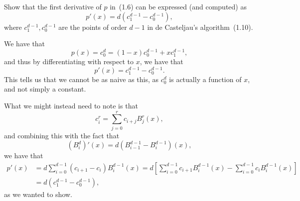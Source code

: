 \begin{exercise}
    Show that the first derivative of $p$ in~(1.6) can be expressed (and computed) as
    \begin{equation*}
        p'(x) = d(c_{1}^{d-1} - c_{0}^{d-1}),
    \end{equation*}
    where $c_{1}^{d-1}, c_{0}^{d-1}$ are the points of order $d-1$ in de Casteljau's algorithm~(1.10).
\end{exercise}

\begin{solution}
    We have that
    \begin{equation*}
        p(x) = c_0^d = (1 - x) c_0^{d-1} + x c_1^{d-1},
    \end{equation*}
    and thus by differentiating with respect to $x$, we have that
    \begin{equation*}
        p'(x) = c_1^{d-1} - c_0^{d-1}.
    \end{equation*}
    This tells us that we cannot be as naive as this, as $c_0^d$ is actually a function of $x$, and not simply a constant.

    What we might instead need to note is that
    \begin{equation*}
        c_i^r = \sum_{j = 0}^r c_{i+j} B_j^r(x),
    \end{equation*}
    and combining this with the fact that
    \begin{equation*}
        \left( B_i^d \right)'(x) = d \left( B_{i-1}^{d-1} - B_i^{d-1} \right)(x),
    \end{equation*}
    we have that
    \begin{align*}
        p'(x)
        &= d \sum_{i = 0}^{d-1} \left( c_{i+1} - c_i \right) B_i^{d-1}(x)
        = d \left[
            \sum_{i = 0}^{d-1} c_{i+1} B_i^{d-1}(x) - \sum_{i = 0}^{d-1} c_i B_i^{d-1}(x)
        \right] \\
        &= d(c_{1}^{d-1} - c_{0}^{d-1}),
    \end{align*}
    as we wanted to show.
\end{solution}
